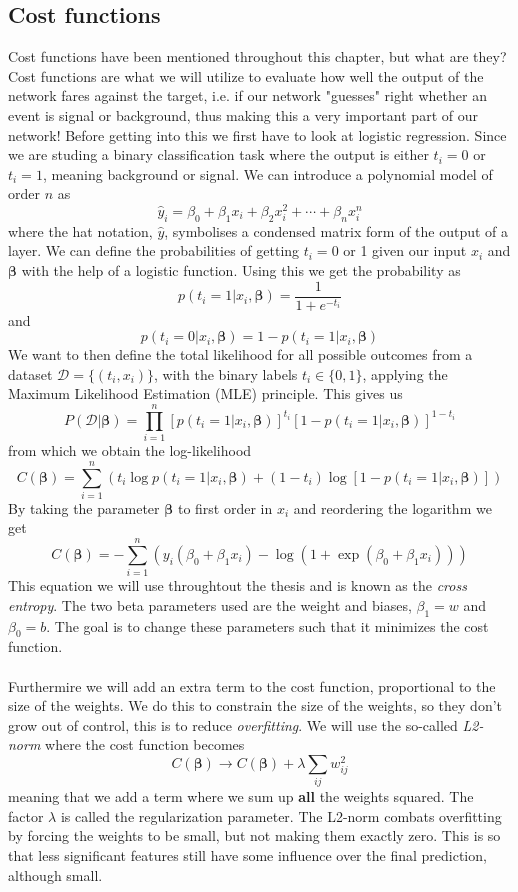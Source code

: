 \documentclass[14pt, a4paper]{book}
\begin{document}
\subsection{Cost functions}
Cost functions have been mentioned throughout this chapter, but what are they? Cost functions are what we will utilize to evaluate how well the output of the network fares against the target, i.e. if our network "guesses" right whether an event is signal or background, 
thus making this a very important part of our network! Before getting into this we first have to look at logistic regression. Since we are studing a binary classification task where the output is either $t_i=0$ or $t_i = 1$, meaning background or signal. 
We can introduce a polynomial model of order $n$ as
$$
\hat{y}_i=\beta_0+\beta_1x_i+\beta_2x_i^2+\cdots+\beta_nx_i^n
$$
where the hat notation, $\hat y$, symbolises a condensed matrix form of the output of a layer. We can define the probabilities of getting $t_i=0$ or 1 given our input $x_i$ and $\bm{\beta}$ with the help of a logistic function. 
Using this we get the probability as
$$
p(t_i=1\vert x_i,\bm{\beta})=\frac{1}{1+e^{-t_i}}
$$
and
$$
p(t_i=0\vert x_i,\bm{\beta})=1- p(t_i=1\vert x_i,\bm{\beta})
$$
We want to then define the total likelihood for all possible outcomes from a dataset $\mathcal{D}=\{(t_i,x_i)\}$, with the binary labels $t_i\in\{0,1\}$, applying the Maximum Likelihood Estimation (MLE) principle. 
This gives us
$$
P(\mathcal{D}\vert\bm{\beta})=\prod_{i=1}^n\left[p(t_i=1\vert x_i,\bm{\beta})\right]^{t_i}\left[1-p(t_i=1\vert x_i,\bm{\beta})\right]^{1-t_i}
$$
from which we obtain the log-likelihood
$$
C(\bm{\beta})=\sum_{i=1}^n\left(t_i\log p(t_i=1\vert x_i,\bm{\beta})+(1-t_i)\log[1-p(t_i=1\vert x_i,\bm{\beta})]\right)
$$
By taking the parameter $\bm{\beta}$ to first order in $x_i$ and reordering the logarithm we get
\begin{equation}\label{eq:CrossEntropy}
    C(\bm{\beta})=-\sum_{i=1}^n(y_i(\beta_0+\beta_1x_i)-\log(1+\exp(\beta_0+\beta_1x_i)))
\end{equation}
This equation we will use throughtout the thesis and is known as the \textit{cross entropy}. The two beta parameters used are the weight and biases, $\beta_1 = w$ and $\beta_0 = b$. The goal is to change these parameters such that it minimizes the cost function. \\
\\Furthermire we will add an extra term to the cost function, proportional to the size of the weights. We do this to constrain the size of the weights, so they don't grow out of control, 
this is to reduce \textit{overfitting}. We will use the so-called \textit{L2-norm} where the cost function becomes
\begin{equation}\label{eq:L2-reg}
    C(\bm\beta)\rightarrow C(\bm\beta)+\lambda\sum_{ij}w_{ij}^2
\end{equation}
meaning that we add a term where we sum up \textbf{all} the weights squared. The factor $\lambda$ is called the regularization parameter. The L2-norm combats overfitting by forcing the weights to be small, but not making them exactly zero. 
This is so that less significant features still have some influence over the final prediction, although small.
\end{document}
